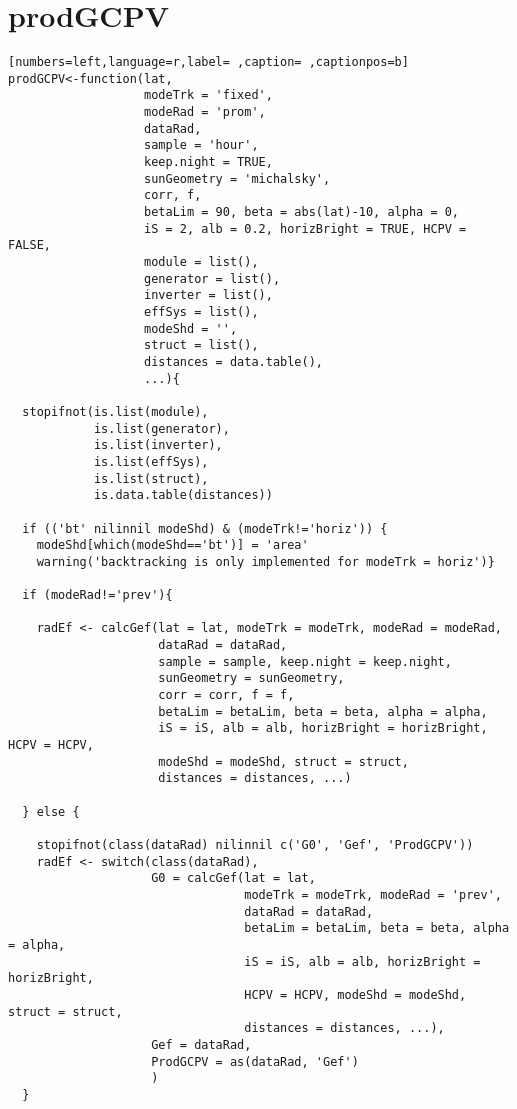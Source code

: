 \section{prodGCPV}
\label{sec:orgab8b612}
\begin{lstlisting}[numbers=left,language=r,label= ,caption= ,captionpos=b]
prodGCPV<-function(lat,
                   modeTrk = 'fixed', 
                   modeRad = 'prom',
                   dataRad,
                   sample = 'hour',
                   keep.night = TRUE,
                   sunGeometry = 'michalsky',
                   corr, f,
                   betaLim = 90, beta = abs(lat)-10, alpha = 0,
                   iS = 2, alb = 0.2, horizBright = TRUE, HCPV = FALSE,
                   module = list(), 
                   generator = list(),
                   inverter = list(), 
                   effSys = list(), 
                   modeShd = '',    
                   struct = list(), 
                   distances = data.table(),
                   ...){

  stopifnot(is.list(module),
            is.list(generator),
            is.list(inverter),
            is.list(effSys),
            is.list(struct),
            is.data.table(distances))

  if (('bt' nilinnil modeShd) & (modeTrk!='horiz')) {
    modeShd[which(modeShd=='bt')] = 'area'
    warning('backtracking is only implemented for modeTrk = horiz')}

  if (modeRad!='prev'){ 

    radEf <- calcGef(lat = lat, modeTrk = modeTrk, modeRad = modeRad,
                     dataRad = dataRad,
                     sample = sample, keep.night = keep.night,
                     sunGeometry = sunGeometry,
                     corr = corr, f = f,
                     betaLim = betaLim, beta = beta, alpha = alpha,
                     iS = iS, alb = alb, horizBright = horizBright, HCPV = HCPV,
                     modeShd = modeShd, struct = struct,
                     distances = distances, ...)

  } else { 

    stopifnot(class(dataRad) nilinnil c('G0', 'Gef', 'ProdGCPV'))
    radEf <- switch(class(dataRad),
                    G0 = calcGef(lat = lat,
                                 modeTrk = modeTrk, modeRad = 'prev',
                                 dataRad = dataRad,
                                 betaLim = betaLim, beta = beta, alpha = alpha,
                                 iS = iS, alb = alb, horizBright = horizBright,
                                 HCPV = HCPV, modeShd = modeShd, struct = struct,
                                 distances = distances, ...),
                    Gef = dataRad,
                    ProdGCPV = as(dataRad, 'Gef')
                    )
  }




\end{lstlisting}
